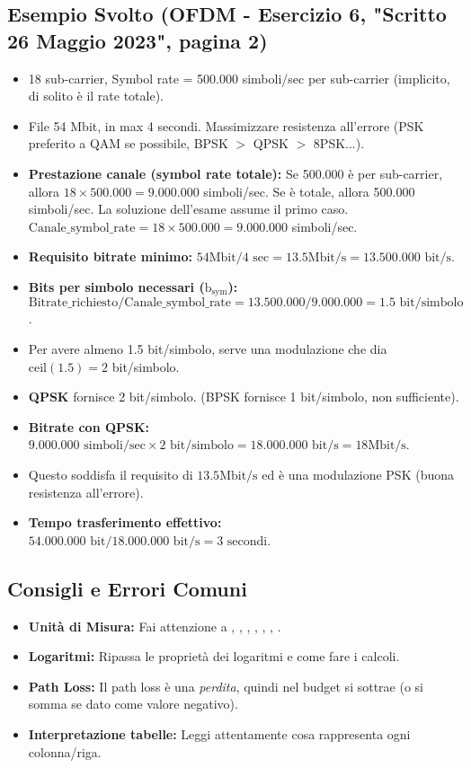 \subsection{Esempio Svolto (OFDM - Esercizio 6, "Scritto 26 Maggio 2023", pagina 2)}
\begin{itemize}
    \item 18 sub-carrier, Symbol rate = 500.000 simboli/sec per sub-carrier (implicito, di solito è il rate totale).
    \item File 54 Mbit, in max 4 secondi. Massimizzare resistenza all'errore (PSK preferito a QAM se possibile, BPSK $>$ QPSK $>$ 8PSK...).
    \item \textbf{Prestazione canale (symbol rate totale):} Se 500.000 è per sub-carrier, allora $18 \times 500.000 = 9.000.000$ simboli/sec. Se è totale, allora 500.000 simboli/sec. La soluzione dell'esame assume il primo caso.
    $\text{Canale\_symbol\_rate} = 18 \times 500.000 = 9.000.000$ simboli/sec.
    \item \textbf{Requisito bitrate minimo:} $54 \text{Mbit} / 4 \text{ sec} = 13.5 \text{Mbit/s} = 13.500.000 \text{ bit/s}$.
    \item \textbf{Bits per simbolo necessari ($\text{b}_{\text{sym}}$):} $\text{Bitrate\_richiesto} / \text{Canale\_symbol\_rate} = 13.500.000 / 9.000.000 = 1.5 \text{ bit/simbolo}$.
    \item Per avere almeno 1.5 bit/simbolo, serve una modulazione che dia $\text{ceil}(1.5) = 2$ bit/simbolo.
    \item \textbf{QPSK} fornisce 2 bit/simbolo. (BPSK fornisce 1 bit/simbolo, non sufficiente).
    \item \textbf{Bitrate con QPSK:} $9.000.000 \text{ simboli/sec} \times 2 \text{ bit/simbolo} = 18.000.000 \text{ bit/s} = 18 \text{Mbit/s}$.
    \item Questo soddisfa il requisito di $13.5 \text{Mbit/s}$ ed è una modulazione PSK (buona resistenza all'errore).
    \item \textbf{Tempo trasferimento effettivo:} $54.000.000 \text{ bit} / 18.000.000 \text{ bit/s} = 3 \text{ secondi}$.
\end{itemize}

\subsection{Consigli e Errori Comuni}
\begin{itemize}
    \item \textbf{Unità di Misura:} Fai attenzione a , , , , , , .
    \item \textbf{Logaritmi:} Ripassa le proprietà dei logaritmi e come fare i calcoli.
    \item \textbf{Path Loss:} Il path loss è una \textit{perdita}, quindi nel budget si sottrae (o si somma se dato come valore negativo).
    \item \textbf{Interpretazione tabelle:} Leggi attentamente cosa rappresenta ogni colonna/riga.
\end{itemize}

